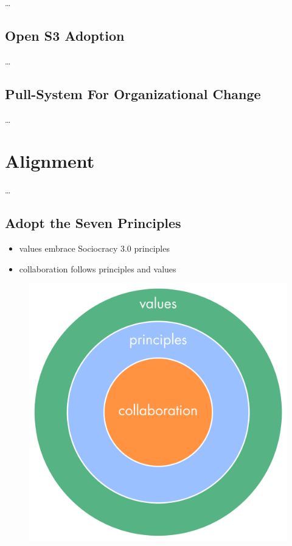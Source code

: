 {\ldots}

\section{Open S3 Adoption}
\label{opens3adoption}

{\ldots}

\section{Pull-System For Organizational Change}
\label{pull-systemfororganizationalchange}

{\ldots}

\chapter{Alignment}
\label{alignment}

{\ldots}

\section{Adopt the Seven Principles}
\label{adoptthesevenprinciples}

\begin{itemize}
\item values embrace Sociocracy 3.0 principles

\item collaboration follows principles and values

\end{itemize}

\begin{figure}[htbp]
\centering
\includegraphics[keepaspectratio,width=\textwidth,height=0.75\textheight]{img/collaboration-values/values-step3.png}
\end{figure}

